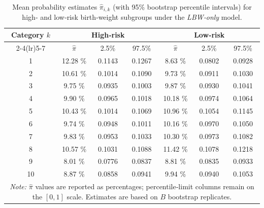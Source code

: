 \begin{table}[H]
\centering
    \caption[Mean Probability Estimates With 95\% Bootstrap Percentile Intervals for for High- and Low-Risk Birth-Weight Subgroups Under the LBW-Only Model]{Mean probability estimates $\hat{\pi}_{i,k}$ (with 95\% bootstrap percentile intervals) for high‑ and low‑risk birth‑weight subgroups under the \emph{LBW‑only} model.}
\label{tab:pi_mean_lbw}
\begin{tabular}{ccccccc}
\toprule
\multirow{2}{*}{Category $k$} & \multicolumn{3}{c}{High‑risk} & \multicolumn{3}{c}{Low‑risk} \\
\cmidrule(lr){2-4}\cmidrule(lr){5-7}
 & $\hat{\pi}$ & 2.5\% & 97.5\% & $\hat{\pi}$ & 2.5\% & 97.5\% \\
\midrule
1  & 12.28 \% & 0.1143 & 0.1267 & 8.63 \% & 0.0802 & 0.0928 \\
2  & 10.61 \% & 0.1014 & 0.1090 & 9.73 \% & 0.0911 & 0.1030 \\
3  & 9.75 \% & 0.0935 & 0.1003 & 9.87 \% & 0.0930 & 0.1041 \\
4  & 9.90 \% & 0.0965 & 0.1018 & 10.18 \% & 0.0974 & 0.1064 \\
5  & 10.43 \% & 0.1014 & 0.1069 & 10.96 \% & 0.1054 & 0.1145 \\
6  & 9.74 \% & 0.0948 & 0.1011 & 10.16 \% & 0.0970 & 0.1050 \\
7  & 9.83 \% & 0.0953 & 0.1033 & 10.30 \% & 0.0973 & 0.1082 \\
8  & 10.57 \% & 0.1031 & 0.1088 & 11.42 \% & 0.1078 & 0.1218 \\
9  & 8.01 \% & 0.0776 & 0.0837 & 8.81 \% & 0.0835 & 0.0933 \\
10 & 8.87 \% & 0.0858 & 0.0941 & 9.94 \% & 0.0940 & 0.1053 \\
\bottomrule
\multicolumn{7}{p{0.9\textwidth}}{\textit{Note:} $\hat{\pi}$ values are reported as percentages; percentile‑limit columns remain on the \([0,1]\) scale.  Estimates are based on $B$ bootstrap replicates.}\\
\end{tabular}
\end{table}
